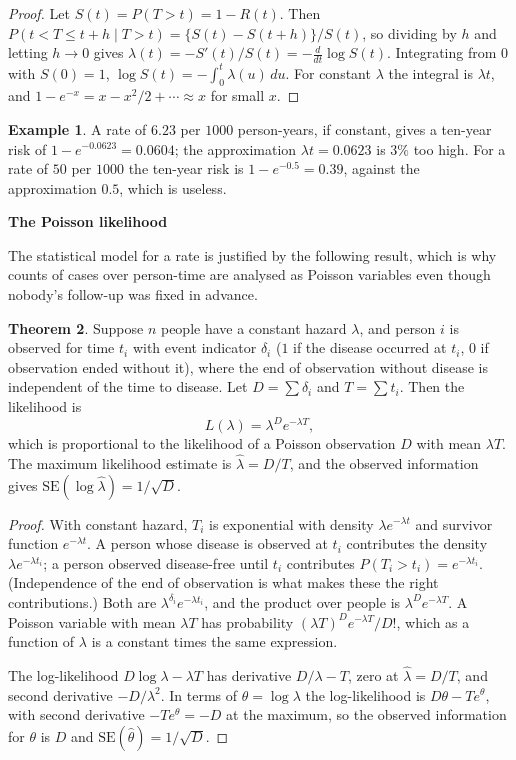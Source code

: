 \documentclass[11pt,a4paper]{article}
\numberwithin{equation}{section}
\theoremstyle{definition}
\newtheorem{thm}{Theorem}[subsection]
\newtheorem{exa}[thm]{Example}
\newcommand{\subhead}[1]{%
  \par\medskip\noindent\textbf{#1}\par\nobreak\smallskip}
\begin{document}
\begin{proof}
Let $S(t) = P(T > t) = 1 - R(t)$. Then $P(t < T \leq t + h \mid T > t) = \{S(t) - S(t + h)\}/S(t)$, so dividing by $h$ and letting $h \to 0$ gives
$\lambda(t) = -S'(t)/S(t) = -\frac{d}{dt}\log S(t)$. Integrating from $0$ with $S(0) = 1$, $\log S(t) = -\int_0^t \lambda(u)\,du$. For constant $\lambda$ the
integral is $\lambda t$, and $1 - e^{-x} = x - x^2/2 + \cdots \approx x$ for small $x$.
\end{proof}

\begin{exa}
A rate of $6.23$ per $1000$ person-years, if constant, gives a ten-year risk of $1 - e^{-0.0623} = 0.0604$; the approximation
$\lambda t = 0.0623$ is $3\%$ too high. For a rate of $50$ per $1000$ the ten-year risk is $1 - e^{-0.5} = 0.39$, against the approximation $0.5$,
which is useless.
\end{exa}

\subhead{The Poisson likelihood}

The statistical model for a rate is justified by the following result, which is why counts of cases over person-time are analysed as
Poisson variables even though nobody's follow-up was fixed in advance.

\begin{thm}
\label{thm:poissonlik}
Suppose $n$ people have a constant hazard $\lambda$, and person $i$ is observed for time $t_i$ with event indicator $\delta_i$ ($1$ if the disease
occurred at $t_i$, $0$ if observation ended without it), where the end of observation without disease is independent of the time to
disease. Let $D = \sum \delta_i$ and $T = \sum t_i$. Then the likelihood is
\[
L(\lambda) = \lambda^D e^{-\lambda T} ,
\]
which is proportional to the likelihood of a Poisson observation $D$ with mean $\lambda T$. The maximum likelihood estimate is $\hat\lambda = D/T$,
and the observed information gives $\text{SE}(\log \hat\lambda) = 1/\sqrt{D}$.
\end{thm}

\begin{proof}
With constant hazard, $T_i$ is exponential with density $\lambda e^{-\lambda t}$ and survivor function $e^{-\lambda t}$. A person whose disease is observed at $t_i$
contributes the density $\lambda e^{-\lambda t_i}$; a person observed disease-free until $t_i$ contributes $P(T_i > t_i) = e^{-\lambda t_i}$. (Independence of the
end of observation is what makes these the right contributions.) Both are $\lambda^{\delta_i} e^{-\lambda t_i}$, and the product over people is $\lambda^D e^{-\lambda T}$.
A Poisson variable with mean $\lambda T$ has probability $(\lambda T)^D e^{-\lambda T}/D!$, which as a function of $\lambda$ is a constant times the same expression.

The log-likelihood $D\log\lambda - \lambda T$ has derivative $D/\lambda - T$, zero at $\hat\lambda = D/T$, and second derivative $-D/\lambda^2$. In terms of
$\theta = \log\lambda$ the log-likelihood is $D\theta - Te^\theta$, with second derivative $-Te^\theta = -D$ at the maximum, so the observed information
for $\theta$ is $D$ and $\text{SE}(\hat\theta) = 1/\sqrt D$.
\end{proof}
\end{document}

